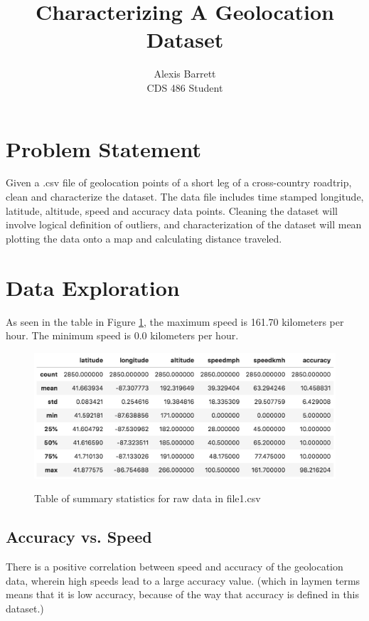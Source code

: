 \documentclass[12pt]{article}
\title{Characterizing A Geolocation Dataset}
\author{Alexis Barrett \\
	CDS 486 Student}
\begin{document}
\maketitle

\section{Problem Statement}

Given a .csv file of geolocation points of a short leg of a cross-country roadtrip, clean and characterize the dataset. The data file includes time stamped longitude, latitude, altitude, speed and accuracy data points.  Cleaning the dataset will involve logical definition of outliers, and characterization of the dataset will mean plotting the data onto a map and calculating distance traveled. 

\section{Data Exploration}

As seen in the table in Figure \ref{summary1}, the maximum speed is 161.70 kilometers per hour. The minimum speed is 0.0 kilometers per hour.

\begin{figure}[h]
	\centering
	\caption{Table of summary statistics for raw data in file1.csv}
	\includegraphics[scale= 0.9]{file1_summary.png}
	\label{summary1}
\end{figure}

\subsection{Accuracy vs. Speed}

  There is a positive correlation between speed and accuracy of the geolocation data, wherein high speeds lead to a large accuracy value. (which in laymen terms means that it is low accuracy, because of the way that accuracy is defined in this dataset.)
\end{document}

